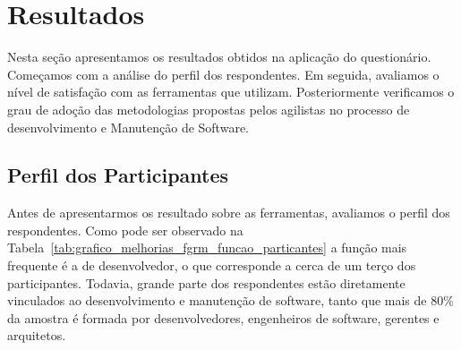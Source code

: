 
\section{Resultados}
\label{sec:analise_dados}

Nesta seção apresentamos os resultados obtidos na aplicação do questionário.
Começamos com a análise do perfil dos respondentes. Em seguida, avaliamos o
nível de satisfação com as ferramentas que utilizam. Posteriormente verificamos
o grau de adoção das metodologias propostas pelos agilistas no processo de
desenvolvimento e Manutenção de Software.

\subsection{Perfil dos Participantes}
\label{sub:pesquisa_prof_perfil_dos_participantes}

Antes de apresentarmos os resultado sobre as ferramentas, avaliamos o perfil dos
respondentes. Como pode ser observado na
Tabela~\ref{tab:grafico_melhorias_fgrm_funcao_particantes} a função mais
frequente é a de desenvolvedor, o que corresponde a cerca de um terço dos
participantes. Todavia, grande parte dos respondentes estão diretamente
vinculados ao desenvolvimento e manutenção de software, tanto que mais de 80\%
da amostra é formada por desenvolvedores, engenheiros de software, gerentes e
arquitetos.

\begin{table}[htpb]
\centering
{}
\caption{Função desempenhada pelos participantes}
\label{tab:grafico_melhorias_fgrm_funcao_particantes}
\end{table}

